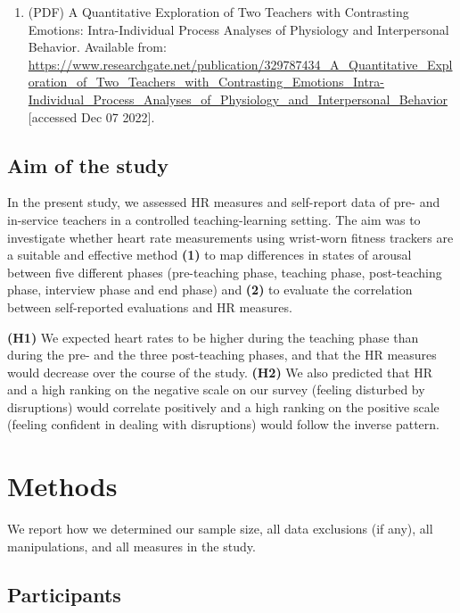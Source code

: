 \documentclass[
  man,floatsintext]{apa6}
\providecommand{\tightlist}{%
  \setlength{\itemsep}{0pt}\setlength{\parskip}{0pt}}
\begin{document}
\begin{enumerate}
\def\labelenumi{(\arabic{enumi})}
\setcounter{enumi}{19}
\tightlist
\item
  (PDF) A Quantitative Exploration of Two Teachers with Contrasting Emotions: Intra-Individual Process Analyses of Physiology and Interpersonal Behavior. Available from: \url{https://www.researchgate.net/publication/329787434_A_Quantitative_Exploration_of_Two_Teachers_with_Contrasting_Emotions_Intra-Individual_Process_Analyses_of_Physiology_and_Interpersonal_Behavior} {[}accessed Dec 07 2022{]}.
\end{enumerate}

\hypertarget{aim-of-the-study}{%
\subsection{Aim of the study}\label{aim-of-the-study}}

In the present study, we assessed HR measures and self-report data of pre- and in-service teachers in a controlled teaching-learning setting. The aim was to investigate whether heart rate measurements using wrist-worn fitness trackers are a suitable and effective method \textbf{(1)} to map differences in states of arousal between five different phases (pre-teaching phase, teaching phase, post-teaching phase, interview phase and end phase) and \textbf{(2)} to evaluate the correlation between self-reported evaluations and HR measures.

\textbf{(H1)} We expected heart rates to be higher during the teaching phase than during the pre- and the three post-teaching phases, and that the HR measures would decrease over the course of the study. \textbf{(H2)} We also predicted that HR and a high ranking on the negative scale on our survey (feeling disturbed by disruptions) would correlate positively and a high ranking on the positive scale (feeling confident in dealing with disruptions) would follow the inverse pattern.

\hypertarget{methods}{%
\section{Methods}\label{methods}}

We report how we determined our sample size, all data exclusions (if any), all manipulations, and all measures in the study.

\hypertarget{participants}{%
\subsection{Participants}\label{participants}}
\end{document}
